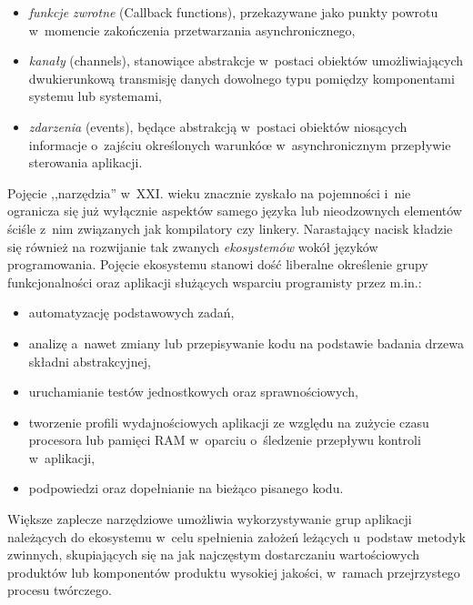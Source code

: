 {\begin{itemize}
  \begin{itemize}
    \item \emph{funkcje zwrotne} (Callback functions), przekazywane jako punkty powrotu w~momencie zakończenia przetwarzania asynchronicznego,
    \item \emph{kanały} (channels), stanowiące abstrakcje w~postaci obiektów umożliwiających dwukierunkową transmisję danych dowolnego typu pomiędzy komponentami systemu lub systemami,
    \item \emph{zdarzenia} (events), będące abstrakcją w~postaci obiektów niosących informacje o~zajściu określonych warunkóœ w~asynchronicznym przepływie sterowania aplikacji.
  \end{itemize}
\end{itemize}
}

\par{
  Pojęcie ,,narzędzia'' w~XXI. wieku znacznie zyskało na pojemności i~nie ogranicza się już wyłącznie aspektów samego języka lub nieodzownych elementów ściśle z~nim związanych jak kompilatory czy linkery.
  Narastający nacisk kładzie się również na rozwijanie tak zwanych \emph{ekosystemów} wokół języków programowania.
  Pojęcie ekosystemu stanowi dość liberalne określenie grupy funkcjonalności oraz aplikacji służących wsparciu programisty przez m.in.:
  \begin{itemize}
    \item automatyzację podstawowych zadań,
    \item analizę a~nawet zmiany lub przepisywanie kodu na podstawie badania drzewa składni abstrakcyjnej,
    \item uruchamianie testów jednostkowych oraz sprawnościowych,
    \item tworzenie profili wydajnościowych aplikacji ze względu na zużycie czasu procesora lub pamięci RAM w~oparciu o~śledzenie przepływu kontroli w~aplikacji,
    \item podpowiedzi oraz dopełnianie na bieżąco pisanego kodu.
  \end{itemize}
}

\par{
  Większe zaplecze narzędziowe umożliwia wykorzystywanie grup aplikacji należących do ekosystemu w~celu spełnienia założeń leżących u~podstaw metodyk zwinnych, skupiających się na jak najczęstym dostarczaniu wartościowych produktów lub komponentów produktu wysokiej jakości, w~ramach przejrzystego procesu twórczego.
}




